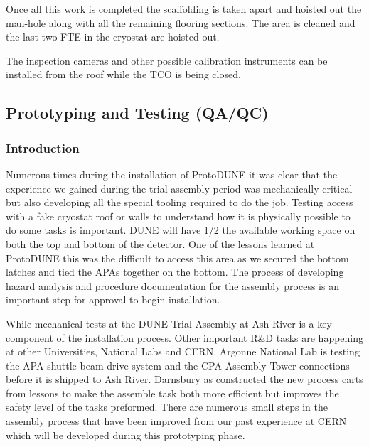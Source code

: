 Once all this work is completed the scaffolding is taken apart and hoisted out the man-hole along with all the remaining flooring sections. The area is cleaned and the last two FTE in the cryostat are hoisted out. 

The inspection cameras and other possible calibration instruments can be installed from the roof while the TCO is being closed.



\clearpage












\subsection{Prototyping and Testing (QA/QC)}
\label{sec:fdsp-tc-inst-qaqc}



\subsubsection{Introduction}


Numerous times during the installation of ProtoDUNE it was clear that the experience we gained during the trial assembly period was mechanically critical but also developing all the special tooling required to do the job.  Testing access with a fake cryostat roof or walls to understand how it is physically possible to do some tasks is important. DUNE will have 1/2 the available working space on both the top and bottom of the detector.  One of the lessons learned at ProtoDUNE this was the difficult to access this area as we secured the bottom latches and tied the APAs together on the bottom.  The process of developing hazard analysis and procedure documentation for the assembly process is an important step for approval to begin installation.   

While mechanical tests at the DUNE-Trial Assembly at Ash River is a key component of the installation process.
Other important R\&D tasks are happening at other Universities, National Labs and CERN. Argonne National Lab is testing the APA shuttle beam drive system and the CPA Assembly Tower connections before it is shipped to Ash River.  
Darnsbury as constructed the new process carts from lessons to make the assemble task both more efficient but improves the safety level of the tasks preformed. 
There are numerous small steps in the assembly process that have been improved from our past experience at CERN which will be developed during this prototyping phase. 

